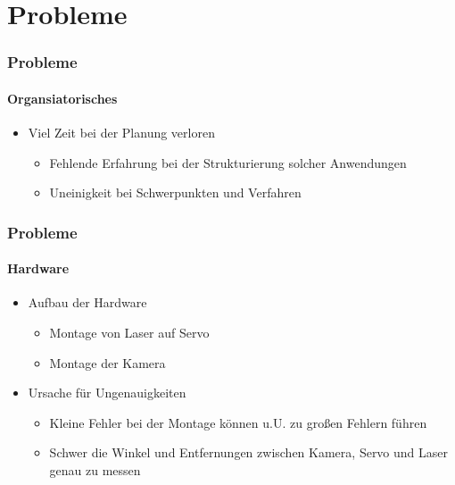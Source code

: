 \documentclass[xcolor=dvipsnames]{beamer}
\begin{document}

\section{Probleme}
\begin{frame}
	\frametitle{Probleme}
	\framesubtitle{Organsiatorisches}

	\begin{itemize}
		\item Viel Zeit bei der Planung verloren
		\begin{itemize}
			\item Fehlende Erfahrung bei der Strukturierung solcher Anwendungen
			\item Uneinigkeit bei Schwerpunkten und Verfahren
		\end{itemize}
	\end{itemize}

\end{frame}


\begin{frame}
	\frametitle{Probleme}
	\framesubtitle{Hardware}

	\begin{itemize}
		\item Aufbau der Hardware
		\begin{itemize}
			\item Montage von Laser auf Servo
			\item Montage der Kamera
		\end{itemize}
		\item Ursache für Ungenauigkeiten
		\begin{itemize}
			\item Kleine Fehler bei der Montage können u.U. zu großen Fehlern führen
			\item Schwer die Winkel und Entfernungen zwischen Kamera, Servo und Laser genau zu messen 
		\end{itemize}
	\end{itemize}

\end{frame}
\end{document}
